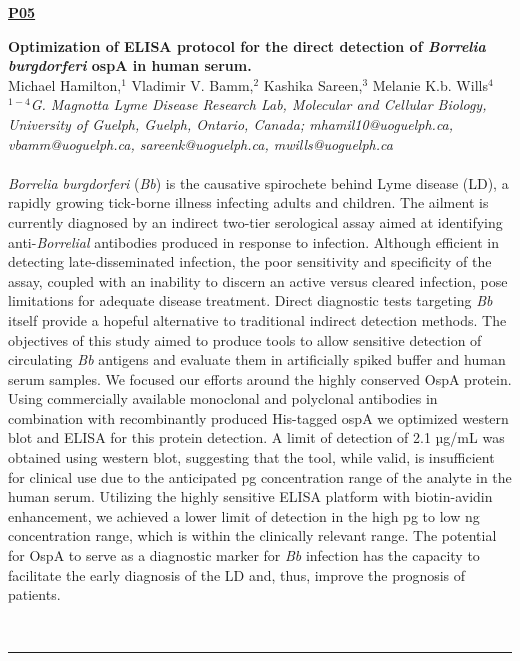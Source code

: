 \documentclass[titlepage,oneside,openany,10pt]{book}
\newenvironment{posterabs}[4] %
        {
	\begin{flushright}
                \underline{\textbf{#4}}
        \end{flushright}
        \textbf{#1}\\%
        #2\\%
        \textit{#3}\\\\%
        }
        {
        \\
        \noindent\rule{15cm}{0.5pt}%
        }
\begin{document}
\vspace{1cm}

\begin{posterabs}
	{Optimization of ELISA protocol for the direct detection of \emph{Borrelia}  \emph{burgdorferi} ospA in human serum.}
	{Michael Hamilton,$^{1}$ Vladimir V. Bamm,$^{2}$ Kashika Sareen,$^{3}$ Melanie K.b. Wills$^{4}$}
	{
	$^{1-4}$G. Magnotta Lyme Disease Research Lab, Molecular and Cellular Biology, University of Guelph, Guelph, Ontario, Canada; mhamil10@uoguelph.ca, vbamm@uoguelph.ca, sareenk@uoguelph.ca, mwills@uoguelph.ca
	}
	{P05}
	\emph{Borrelia burgdorferi} (\emph{Bb}) is the causative spirochete behind Lyme disease (LD), a rapidly growing tick-borne illness infecting adults and children. The ailment is currently diagnosed by an indirect two-tier serological assay aimed at identifying anti-\emph{Borrelial} antibodies produced in response to infection. Although efficient in detecting late-disseminated infection, the poor sensitivity and specificity of the assay, coupled with an inability to discern an active versus cleared infection, pose limitations for adequate disease treatment. Direct diagnostic tests targeting \emph{Bb} itself provide a hopeful alternative to traditional indirect detection methods. The objectives of this study aimed to produce tools to allow sensitive detection of circulating \emph{Bb} antigens and evaluate them in artificially spiked buffer and human serum samples. We focused our efforts around the highly conserved OspA protein. Using commercially available monoclonal and polyclonal antibodies in combination with recombinantly produced His-tagged ospA we optimized western blot and ELISA for this protein detection. A limit of detection of 2.1 µg/mL was obtained using western blot, suggesting that the tool, while valid, is insufficient for clinical use due to the anticipated pg concentration range of the analyte in the human serum. Utilizing the highly sensitive ELISA platform with biotin-avidin enhancement, we achieved a lower limit of detection in the high pg to low ng concentration range, which is within the clinically relevant range. The potential for OspA to serve as a diagnostic marker for \emph{Bb} infection has the capacity to facilitate the early diagnosis of the LD and, thus, improve the prognosis of patients.
	\label{HamiltonM}
\end{posterabs}
\end{document}
